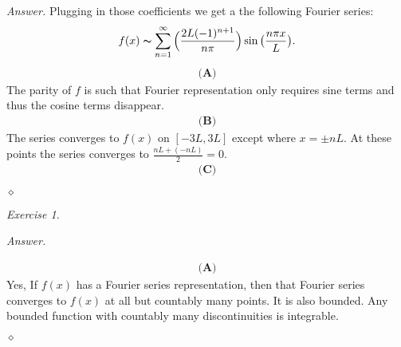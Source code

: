 \documentclass[12pt,oneside]{amsart}
\theoremstyle{definition}
\theoremstyle{remark}
\newtheorem{exer}{Exercise}
\numberwithin{equation}{exer}
\newenvironment{answer}{\bigskip\noindent\emph{Answer.}}{\hfill$\diamond$\newline}
\begin{document}
\begin{answer}
Plugging in those coefficients we get a the following Fourier series:
\begin{align*}
    f(x)\thicksim \sum_{n=1}^{\infty} \Big(\frac{2L(-1)^{n+1}}{n \pi}\Big)\sin\big(\frac{ n \pi x}{L}\big).
\end{align*}
\begin{align*}
    \textbf{(A)}
\end{align*}
The parity of $f$ is such that Fourier representation only requires sine terms and thus the cosine terms disappear. 
\begin{align*}
    \textbf{(B)}
\end{align*}
The series converges to $f(x)$ on $[-3L, 3L]$ except where $x = \pm nL$. At these points the series converges to $\frac{nL+(-nL)}{2}=0$.
 \begin{align*}
     \textbf{(C)}
 \end{align*}

\end{answer}
\newpage
\begin{exer} 

\end{exer}
\begin{answer}


\begin{align*}
    \textbf{(A)}
\end{align*}
Yes, If $f(x)$ has a Fourier series representation, then that Fourier series converges to $f(x)$ at all but countably many points. It is also bounded. Any bounded function with countably many discontinuities is integrable. 

\end{answer}
\end{document}
